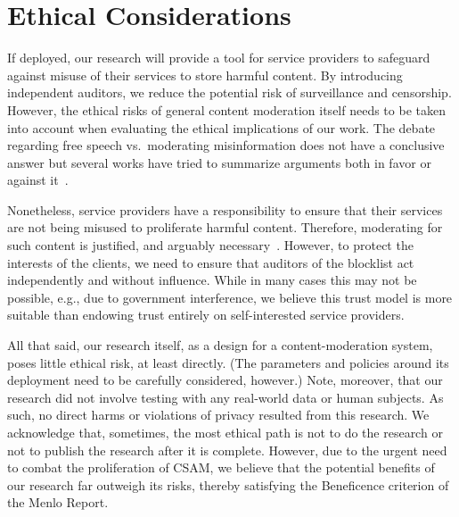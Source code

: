 \section{Ethical Considerations}
%
If deployed, our research will provide a tool for service providers to
safeguard against misuse of their services to store harmful
content. By introducing independent auditors, we reduce the potential
risk of surveillance and censorship. However, the ethical risks of
general content moderation itself needs to be taken into account when
evaluating the ethical implications of our work. The debate regarding
free speech vs.\ moderating misinformation does not have a conclusive
answer but several works have tried to summarize arguments both in
favor or against it~\cite{kozyreva2023resolving}.

Nonetheless, service providers have a responsibility to ensure that
their services are not being misused to proliferate harmful
content. Therefore, moderating for such content is justified, and
arguably necessary~\cite{howard2023ethics}. However, to protect the
interests of the clients, we need to ensure that auditors of the
blocklist act independently and without influence. While in many cases
this may not be possible, e.g., due to government interference, we
believe this trust model is more suitable than endowing trust entirely
on self-interested service providers.

All that said, our research itself, as a design for a content-moderation system, poses little ethical risk, at least directly.  (The parameters and policies around its deployment need to be carefully considered, however.)  Note, moreover, that our research
did not involve testing with any real-world data or human subjects. As
such, no direct harms or violations of privacy resulted from this
research. We acknowledge that, sometimes, the most ethical path is not to do the
research or not to publish the research after it is complete. However,
due to the urgent need to combat the proliferation of CSAM, we believe
that the potential benefits of our research far outweigh its risks,
thereby satisfying the Beneficence criterion of the Menlo Report.

